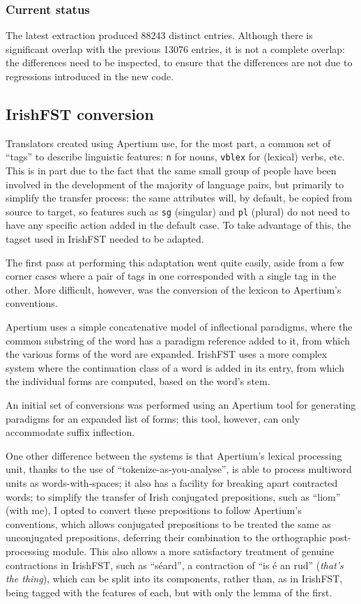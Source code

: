 \subsubsection{Current status}

The latest extraction produced 88243 distinct entries. Although there is significant 
overlap with the previous 13076 entries, it is not a complete overlap: the differences 
need to be inspected, to ensure that the differences are not due to regressions 
introduced in the new code.

\subsection{IrishFST conversion}

Translators created using Apertium use, for the most part, a common set of ``tags'' to
describe linguistic features: \texttt{n} for nouns, \texttt{vblex} for (lexical) verbs, etc.
This is in part due to the fact that the same small group of people have been involved
in the development of the majority of language pairs, but primarily to simplify the
transfer process: the same attributes will, by default, be copied from source to target,
so features such as \texttt{sg} (singular) and \texttt{pl} (plural) do not need to
have any specific action added in the default case. To take advantage of this, the 
tagset used in IrishFST needed to be adapted.

The first pass at performing this adaptation went quite easily, aside from a few
corner cases where a pair of tags in one corresponded with a single tag in the other.
More difficult, however, was the conversion of the lexicon to Apertium's conventions.

Apertium uses a simple concatenative model of inflectional paradigms, where the common
substring of the word has a paradigm reference added to it, from which the various forms
of the word are expanded. IrishFST uses a more complex system where the continuation class
of a word is added in its entry, from which the individual forms are computed, based on
the word's stem.

An initial set of conversions was performed using an Apertium tool for generating paradigms
for an expanded list of forms; this tool, however, can only accommodate suffix inflection.

One other difference between the systems is that Apertium's lexical processing unit, thanks
to the use of ``tokenize-as-you-analyse'', is able to process multiword units as words-with-spaces;
it also has a facility for breaking apart contracted words; to simplify the transfer of Irish
conjugated prepositions, such as ``liom'' (with me), I opted to convert these prepositions to
follow Apertium's conventions, which allows conjugated prepositions to be treated the same
as unconjugated prepositions, deferring their combination to the orthographic post-processing
module. This also allows a more satisfactory treatment of genuine contractions in IrishFST,
such as ``s\'eard'', a contraction of ``is \'e an rud'' (\textit{that's the thing}), which
can be split into its components, rather than, as in IrishFST, being tagged with the features
of each, but with only the lemma of the first.

